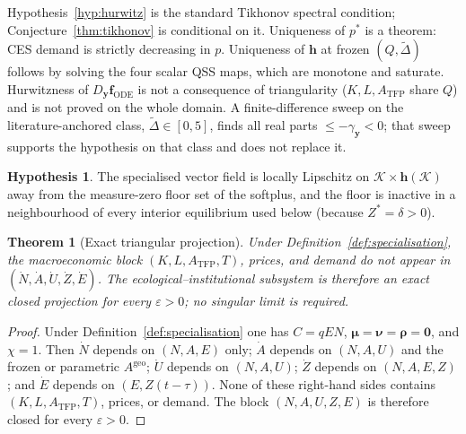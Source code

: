 \documentclass[11pt]{article}
\newtheorem{theorem}{Theorem}
\theoremstyle{definition}
\newtheorem{hypothesis}{Hypothesis}
\begin{document}
Hypothesis~\ref{hyp:hurwitz} is the standard Tikhonov spectral condition; Conjecture~\ref{thm:tikhonov} is conditional on it. Uniqueness of $p^*$ is a theorem: CES demand is strictly decreasing in $p$. Uniqueness of $\mathbf h$ at frozen $(Q,\widetilde\Delta)$ follows by solving the four scalar QSS maps, which are monotone and saturate. Hurwitzness of $D_{\mathbf y}\mathbf f_{\mathrm{ODE}}$ is not a consequence of triangularity ($K,L,A_{\mathrm{TFP}}$ share $Q$) and is not proved on the whole domain. A finite-difference sweep on the literature-anchored class, $\widetilde\Delta\in[0,5]$, finds all real parts $\le-\gamma_{\mathbf y}<0$; that sweep supports the hypothesis on that class and does not replace it.

\begin{hypothesis}
\label{hyp:lipschitz}
The specialised vector field is locally Lipschitz on $\mathcal K\times\mathbf h(\mathcal K)$ away from the measure-zero floor set of the softplus, and the floor is inactive in a neighbourhood of every interior equilibrium used below (because $Z^*=\delta>0$).
\end{hypothesis}

\begin{theorem}[Exact triangular projection]
\label{thm:triangle}
Under Definition~\ref{def:specialisation}, the macroeconomic block $(K,L,A_{\mathrm{TFP}},T)$, prices, and demand do not appear in $(\dot N,\dot A,\dot U,\dot Z,\dot E)$. The ecological--institutional subsystem is therefore an exact closed projection for every $\varepsilon>0$; no singular limit is required.
\end{theorem}

\begin{proof}
Under Definition~\ref{def:specialisation} one has $C=qEN$, $\boldsymbol\mu=\boldsymbol\nu=\boldsymbol\rho=\mathbf 0$, and $\chi=1$. Then $\dot N$ depends on $(N,A,E)$ only; $\dot A$ depends on $(N,A,U)$ and the frozen or parametric $A^{\mathrm{geo}}$; $\dot U$ depends on $(N,A,U)$; $\dot Z$ depends on $(N,A,E,Z)$; and $\dot E$ depends on $(E,Z(t-\tau))$. None of these right-hand sides contains $(K,L,A_{\mathrm{TFP}},T)$, prices, or demand. The block $(N,A,U,Z,E)$ is therefore closed for every $\varepsilon>0$.
\end{proof}
\end{document}
